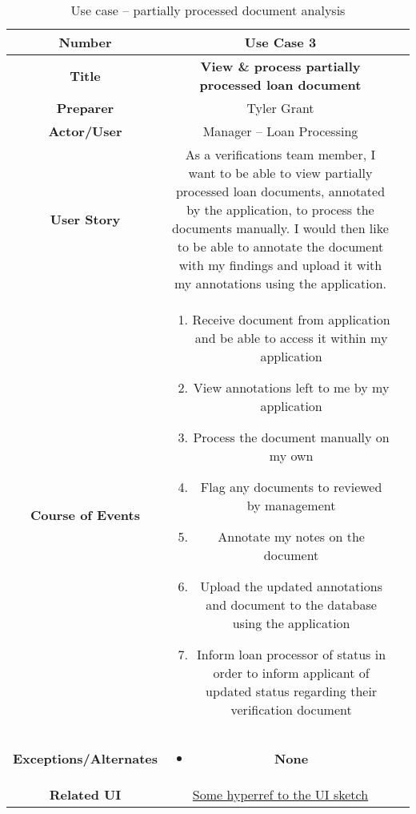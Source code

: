 \begin{table}[H]
    \centering
    \begin{tabularx}{0.75\linewidth}{||Sc|X||}
        \hline
        \hline
        \textbf{Number} & \textbf{Use Case 3} \\
        \hline
        \textbf{Title} & \textbf{View \& process partially processed loan document} \\
        \hline
        \textbf{Preparer} & Tyler Grant \\
        \hline
        \textbf{Actor/User} & Manager -- Loan Processing \\
        \hline
        \textbf{User Story} &
        As a verifications team member, I want to be able to view partially processed loan documents, annotated by the application, to process the documents manually. I would then like to be able to annotate the document with my findings and upload it with my annotations using the application. \\
        \hline
        \textbf{Course of Events} &
        \begin{minipage}[l]{\linewidth}
            \begin{enumerate}[wide, labelindent=0pt]
                \item Receive document from application and be able to access it within my application
                \item View annotations left to me by my application
                \item Process the document manually on my own
                \item Flag any documents to reviewed by management
                \item Annotate my notes on the document
                \item Upload the updated annotations and document to the database using the application
                \item Inform loan processor of status in order to inform applicant of updated status regarding their verification document
            \end{enumerate}
            \vspace{4pt}
        \end{minipage} \\
        \hline
        \textbf{Exceptions/Alternates} & 
        \begin{minipage}[l]{\linewidth}
            \vspace{2pt}
            \begin{itemize}[wide, labelindent=0pt]
                \item \textbf{None}
            \end{itemize}
        \end{minipage} \\
        \hline
        \textbf{Related UI} & \hyperref[templatesec]{Some hyperref to the UI sketch} \\
        \hline
        \hline
    \end{tabularx}
    \caption{Use case -- partially processed document analysis}
    \label{tab:use_case_partially_processed}
\end{table}

